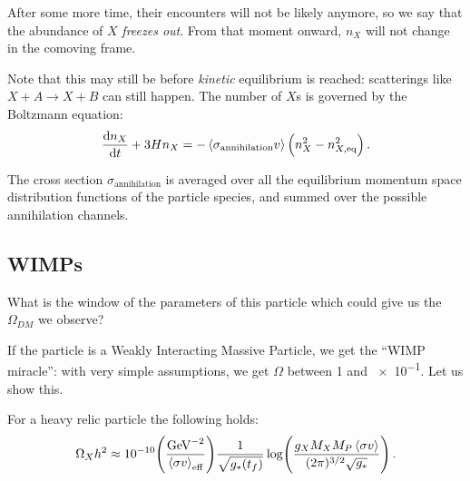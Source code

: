 \documentclass[main.tex]{subfiles}
\begin{document}
After some more time, their encounters will not be likely anymore, so we say that the abundance of \(X\) \emph{freezes out}.
From that moment onward, \(n_X\) will not change in the comoving frame.

Note that this may still be before \emph{kinetic} equilibrium is reached: scatterings like \(X + A \to X + B\) can still happen. 
The number of \(X\)s is governed by the Boltzmann equation: 
%
\begin{align}
\dv{n_X}{t} + 3 H n_X  = - \expval{\sigma _{\text{annihilation}}v } \qty(n_X^2 - n_{X, \text{eq}}^2)
\,.
\end{align}

The cross section \(\sigma _{\text{annihilation}}\) is averaged over all the equilibrium momentum space distribution functions of the particle species, and summed over the possible annihilation channels.





\subsection{WIMPs}

What is the window of the parameters of this particle which could give us the \(\Omega_{DM}\) we observe?

If the particle is a Weakly Interacting Massive Particle, we get the ``WIMP miracle'': with very simple assumptions, we get \(\Omega \) between 1 and \num{e-1}. Let us show this.

\begin{claim}
For a heavy relic particle the following holds:
%
\begin{align}
\Omega_{X} h^2 \approx \num{e-10} 
\qty(\frac{\SI{}{GeV^{-2}}}{\expval{\sigma v}_{\text{eff}}})
\frac{1}{\sqrt{g_* (t_f)}}
\log(
    \frac{g_X M_X M_P \expval{\sigma v}}{(2 \pi )^{3/2} \sqrt{g_*}}
)
\,.
\end{align}
\end{claim}
\end{document}
